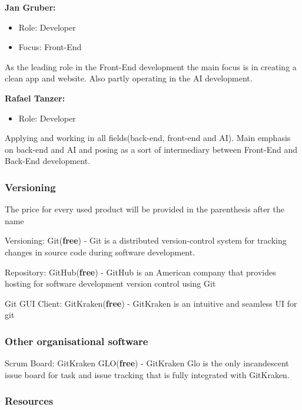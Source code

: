 \documentclass[12pt]{article}
\theoremstyle{definition}
\begin{document}
    \vspace{1em}
    {\bf Jan Gruber:}
    \begin{itemize}
        \item Role: Developer
        \item Focus: Front-End
    \end{itemize}
    As the leading role in the Front-End development the main focus is in creating a clean app and website. Also partly operating in the AI development. 
    
    \vspace{1em}
    {\bf Rafael Tanzer:}
    \begin{itemize}
        \item Role: Developer
    \end{itemize}
    Applying and working in all fields(back-end, front-end and AI).
    Main emphasis on back-end and AI and posing as a sort of intermediary between Front-End and Back-End development.
    
\subsubsection{Versioning}

    The price for every used product will be provided in the parenthesis after the name

    Versioning: Git({\bf free}) - Git is a distributed version-control system for tracking changes in source code during software development. 
    
    Repository: GitHub({\bf free}) - GitHub is an American company that provides hosting for software development version control using Git
    
    Git GUI Client: GitKraken({\bf free}) -  GitKraken is an intuitive and seamless UI for git
    
\subsubsection{Other organisational software}

    Scrum Board: GitKraken GLO({\bf free}) - GitKraken Glo is the only incandescent issue board for task and issue tracking that is fully integrated with GitKraken. 

\pagebreak
\subsubsection{Resources}
    
\end{document}
